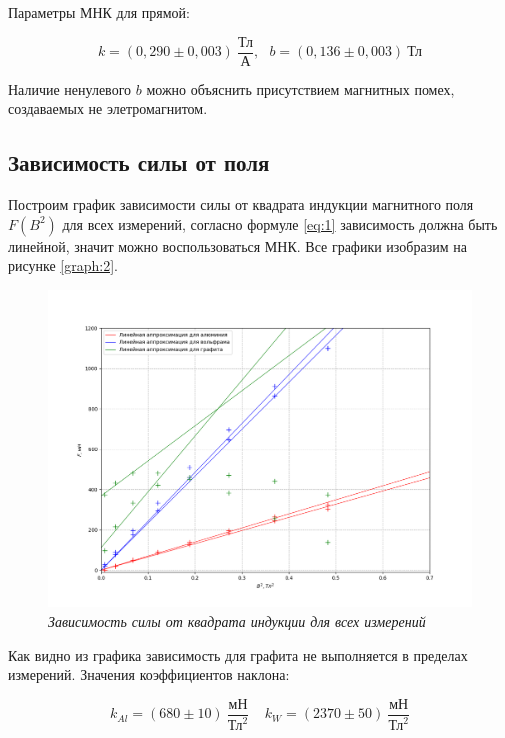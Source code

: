 \documentclass[a4paper,12pt]{article}
\begin{document}
Параметры МНК для прямой:

\begin{equation*}
    k = (0,290 \pm 0,003) \ \frac{\text{Тл}}{\text{А}}, \ \ \ b = (0,136 \pm 0,003) \ \text{Тл}
\end{equation*}

Наличие ненулевого $b$ можно объяснить присутствием магнитных помех, создаваемых не элетромагнитом.

\subsection{Зависимость силы от поля}

Построим график зависимости силы от квадрата индукции магнитного поля $F(B^2)$ для всех измерений, согласно формуле \eqref{eq:1} зависимость должна быть линейной, значит можно воспользоваться МНК. Все графики изобразим на рисунке \ref{graph:2}.

\begin{figure}[!ht]
        \centering
	\includegraphics[width=1.0\textwidth]{graph_b2_f.png}
	\caption{\textit{Зависимость силы от квадрата индукции для всех измерений}}
	\label{graph:1}
\end{figure}

Как видно из графика зависимость для графита не выполняется в пределах измерений. Значения коэффициентов наклона:

\begin{equation*}
    k_{Al} = (680 \pm 10) \ \frac{\text{мН}}{\text{Тл}^2} \ \ \ \ \ k_{W} = (2370 \pm 50) \ \frac{\text{мН}}{\text{Тл}^2}
\end{equation*}
\end{document}

